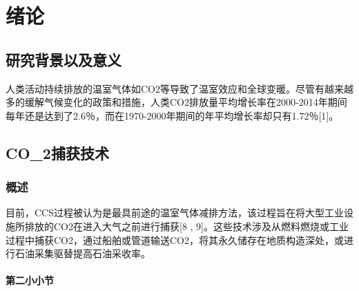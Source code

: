\chapter{绪\quad 论}

\section{研究背景以及意义}

人类活动持续排放的温室气体如CO2等导致了温室效应和全球变暖。尽管有越来越多的缓解气候变化的政策和措施，人类CO2排放量平均增长率在2000-2014年期间每年还是达到了2.6％，而在1970-2000年期间的年平均增长率却只有1.72％[1]。

\section{CO_2捕获技术}

\subsection{概述}

目前，CCS过程被认为是最具前途的温室气体减排方法，该过程旨在将大型工业设施所排放的CO2在进入大气之前进行捕获[8 , 9]。这些技术涉及从燃料燃烧或工业过程中捕获CO2，通过船舶或管道输送CO2，将其永久储存在地质构造深处，或进行石油采集驱替提高石油采收率。

\subsubsection{第二小小节}

